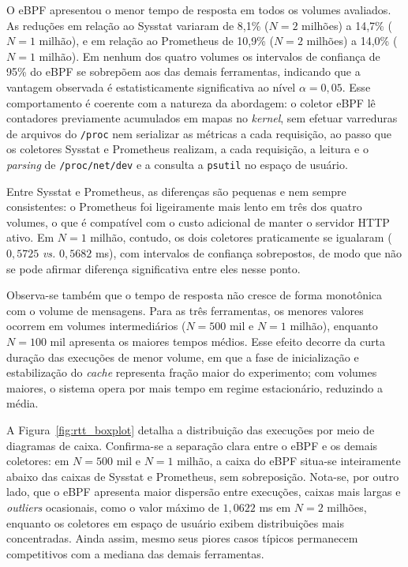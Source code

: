 O eBPF apresentou o menor tempo de resposta em todos os volumes avaliados. As reduções em relação ao Sysstat variaram de 8,1\% ($N = 2$ milhões) a 14,7\% ($N = 1$ milhão), e em relação ao Prometheus de 10,9\% ($N = 2$ milhões) a 14,0\% ($N = 1$ milhão). Em nenhum dos quatro volumes os intervalos de confiança de 95\% do eBPF se sobrepõem aos das demais ferramentas, indicando que a vantagem observada é estatisticamente significativa ao nível $\alpha = 0{,}05$. Esse comportamento é coerente com a natureza da abordagem: o coletor eBPF lê contadores previamente acumulados em mapas no \textit{kernel}, sem efetuar varreduras de arquivos do \texttt{/proc} nem serializar as métricas a cada requisição, ao passo que os coletores Sysstat e Prometheus realizam, a cada requisição, a leitura e o \textit{parsing} de \texttt{/proc/net/dev} e a consulta a \texttt{psutil} no espaço de usuário.

Entre Sysstat e Prometheus, as diferenças são pequenas e nem sempre consistentes: o Prometheus foi ligeiramente mais lento em três dos quatro volumes, o que é compatível com o custo adicional de manter o servidor HTTP ativo. Em $N = 1$ milhão, contudo, os dois coletores praticamente se igualaram ($0{,}5725$ \textit{vs.} $0{,}5682$ ms), com intervalos de confiança sobrepostos, de modo que não se pode afirmar diferença significativa entre eles nesse ponto.

Observa-se também que o tempo de resposta não cresce de forma monotônica com o volume de mensagens. Para as três ferramentas, os menores valores ocorrem em volumes intermediários ($N = 500$ mil e $N = 1$ milhão), enquanto $N = 100$ mil apresenta os maiores tempos médios. Esse efeito decorre da curta duração das execuções de menor volume, em que a fase de inicialização e estabilização do \textit{cache} representa fração maior do experimento; com volumes maiores, o sistema opera por mais tempo em regime estacionário, reduzindo a média.

A Figura~\ref{fig:rtt_boxplot} detalha a distribuição das execuções por meio de diagramas de caixa. Confirma-se a separação clara entre o eBPF e os demais coletores: em $N = 500$ mil e $N = 1$ milhão, a caixa do eBPF situa-se inteiramente abaixo das caixas de Sysstat e Prometheus, sem sobreposição. Nota-se, por outro lado, que o eBPF apresenta maior dispersão entre execuções, caixas mais largas e \textit{outliers} ocasionais, como o valor máximo de $1{,}0622$ ms em $N = 2$ milhões, enquanto os coletores em espaço de usuário exibem distribuições mais concentradas. Ainda assim, mesmo seus piores casos típicos permanecem competitivos com a mediana das demais ferramentas.

